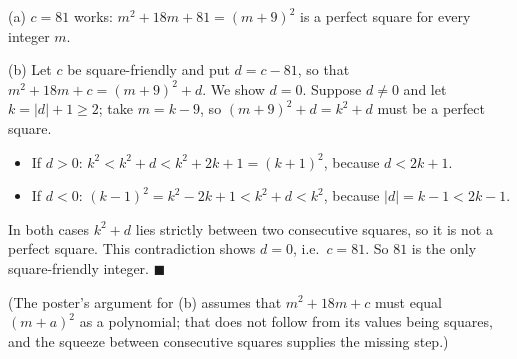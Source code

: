 (a) $c=81$ works: $m^2+18m+81=(m+9)^2$ is a perfect square for every integer $m$.

(b) Let $c$ be square-friendly and put $d=c-81$, so that $m^2+18m+c=(m+9)^2+d$. We show $d=0$. Suppose $d\ne0$ and let $k=|d|+1\ge2$; take $m=k-9$, so $(m+9)^2+d=k^2+d$ must be a perfect square.
\begin{itemize}
\item If $d>0$: $k^2<k^2+d<k^2+2k+1=(k+1)^2$, because $d<2k+1$.
\item If $d<0$: $(k-1)^2=k^2-2k+1<k^2+d<k^2$, because $|d|=k-1<2k-1$.
\end{itemize}
In both cases $k^2+d$ lies strictly between two consecutive squares, so it is not a perfect square. This contradiction shows $d=0$, i.e.\ $c=81$. So $\boxed{81}$ is the only square-friendly integer. $\blacksquare$

(The poster's argument for (b) assumes that $m^2+18m+c$ must equal $(m+a)^2$ as a polynomial; that does not follow from its values being squares, and the squeeze between consecutive squares supplies the missing step.)
